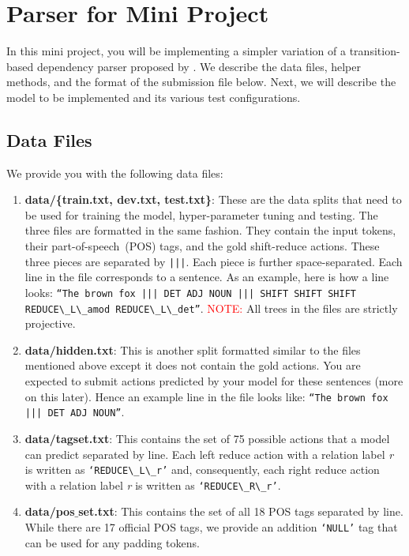 \section{Parser for Mini Project}
In this mini project, you will be implementing a simpler variation of a transition-based dependency parser proposed by \citet{chen2014fast}. We describe the data files, helper methods, and the format of the submission file below. Next, we will describe the model to be implemented and its various test configurations.

\subsection{Data Files}
We provide you with the following data files:
\begin{enumerate}
    \item \textbf{data/\{train.txt, dev.txt, test.txt\}}:  These are the data splits that need to be used for training the model, hyper-parameter tuning and testing. The three files are formatted in the same fashion. They contain the input tokens, their part-of-speech~(POS) tags, and the gold shift-reduce actions. These three pieces are separated by \texttt{|||}. Each piece is further space-separated. Each line in the file corresponds to a sentence. As an example, here is how a line looks: \texttt{``The brown fox $|||$ DET ADJ NOUN $|||$ SHIFT SHIFT SHIFT REDUCE$\_$L$\_$amod REDUCE$\_$L$\_$det''}. \textcolor{red}{NOTE:} All trees in the files are strictly projective.
    \item \textbf{data/hidden.txt}: This is another split formatted similar to the files mentioned above except it does not contain the gold actions. You are expected to submit actions predicted by your model for these sentences (more on this later). Hence  an example line in the file looks like: \texttt{``The brown fox $|||$ DET ADJ NOUN''}.  
    \item \textbf{data/tagset.txt}: This contains the set of 75 possible actions that a model can predict separated by line. Each left reduce action with a relation label \emph{r} is written as \texttt{`REDUCE$\_$L$\_$r'} and, consequently, each right reduce action with a relation label \emph{r} is written as \texttt{`REDUCE$\_$R$\_$r'}.
    \item \textbf{data/pos$\_$set.txt}: This contains the set of all 18 POS tags separated by line. While there are 17 official POS tags, we provide an addition \texttt{`NULL'} tag that can be used for any padding tokens.
\end{enumerate}


